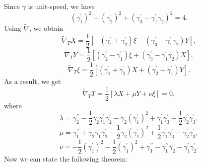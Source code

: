\documentclass{amsart}
\theoremstyle{plain}
\theoremstyle{definition}
\theoremstyle{remark}
\numberwithin{equation}{section}
\begin{document}
Since $\gamma $ is unit-speed, we have%
\begin{equation}
\left( \gamma _{1}^{\prime }\right) ^{2}+\left( \gamma _{2}^{\prime }\right)
^{2}+\left( \gamma _{3}^{\prime }-\gamma _{1}^{\prime }\gamma _{2}\right)
^{2}=4.  \label{unitR3}
\end{equation}%
Using $\widetilde{\nabla }$, we obtain%
\begin{equation}
\widetilde{\nabla }_{T}X=\frac{1}{2}\left[ -\left( \gamma _{1}^{\prime
}+\gamma _{2}^{\prime }\right) \xi -\left( \gamma _{3}^{\prime }-\gamma
_{1}^{\prime }\gamma _{2}\right) Y\right] ,  \label{*}
\end{equation}%
\begin{equation}
\widetilde{\nabla }_{T}Y=\frac{1}{2}\left[ \left( \gamma _{2}^{\prime
}-\gamma _{1}^{\prime }\right) \xi +\left( \gamma _{3}^{\prime }-\gamma
_{1}^{\prime }\gamma _{2}\right) X\right] ,  \label{**}
\end{equation}%
\begin{equation}
\widetilde{\nabla }_{T}\xi =\frac{1}{2}\left[ \left( \gamma _{1}^{\prime
}+\gamma _{2}^{\prime }\right) X+\left( \gamma _{2}^{\prime }-\gamma
_{1}^{\prime }\right) Y\right] .  \label{***}
\end{equation}%
As a result, we get%
\begin{equation}
\widetilde{\nabla }_{T}T=\frac{1}{2}\left[ \lambda X+\mu Y+\nu \xi \right]
=0,  \label{geodesicR3}
\end{equation}%
where%
\begin{equation*}
\lambda =\gamma _{2}^{\prime \prime }-\frac{1}{2}\gamma _{2}\gamma
_{1}^{\prime }\gamma _{2}^{\prime }-\gamma _{2}\left( \gamma _{1}^{\prime
}\right) ^{2}+\gamma _{1}^{\prime }\gamma _{3}^{\prime }+\frac{1}{2}\gamma
_{2}^{\prime }\gamma _{3}^{\prime },
\end{equation*}%
\begin{equation*}
\mu =\gamma _{1}^{\prime \prime }+\gamma _{2}\gamma _{1}^{\prime }\gamma
_{2}^{\prime }-\frac{1}{2}\gamma _{2}\left( \gamma _{1}^{\prime }\right)
^{2}+\frac{1}{2}\gamma _{1}^{\prime }\gamma _{3}^{\prime }-\gamma
_{2}^{\prime }\gamma _{3}^{\prime },
\end{equation*}%
\begin{equation*}
\nu =-\frac{1}{2}\left( \gamma _{1}^{\prime }\right) ^{2}-\frac{1}{2}\left(
\gamma _{1}^{\prime }\right) ^{2}+\gamma _{3}^{\prime \prime }-\gamma
_{1}^{\prime \prime }\gamma _{2}-\gamma _{1}^{\prime }\gamma _{2}^{\prime }.
\end{equation*}%
Now we can state the following theorem:
\end{document}
